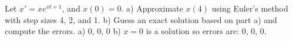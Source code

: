 {Let $x' = x e^{xt+1}$, and $x(0)=0$.
a) Approximate $x(4)$ using Euler's method with step sizes 4, 2, and 1.
b) Guess an exact solution based on part a) and compute the errors.}
{a) 0, 0, 0
\quad
b) $x=0$ is a solution so errors are: 0, 0, 0.}